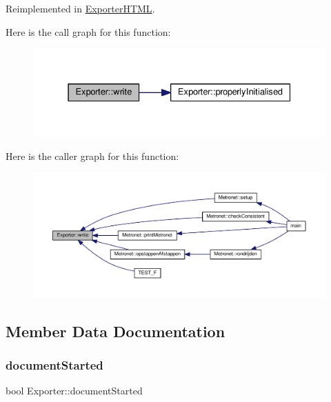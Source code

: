 Reimplemented in \hyperlink{class_exporter_h_t_m_l_ace2649c240282289d4cb3bfbd19e427c}{Exporter\+H\+T\+ML}.

Here is the call graph for this function\+:\nopagebreak
\begin{figure}[H]
\begin{center}
\leavevmode
\includegraphics[width=331pt]{class_exporter_ab3736803133eb727cf87a7306f91eb11_cgraph}
\end{center}
\end{figure}
Here is the caller graph for this function\+:\nopagebreak
\begin{figure}[H]
\begin{center}
\leavevmode
\includegraphics[width=350pt]{class_exporter_ab3736803133eb727cf87a7306f91eb11_icgraph}
\end{center}
\end{figure}


\subsection{Member Data Documentation}
\mbox{\label{class_exporter_a7d55f6023d5fe983512f6b02fb60733b}} 
\subsubsection{\texorpdfstring{document\+Started}{documentStarted}}
{\footnotesize\ttfamily bool Exporter\+::document\+Started\hspace{0.3cm}{\ttfamily [protected]}}

